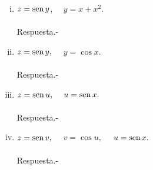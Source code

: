 \begin{enumerate}[\bfseries 1.]
	 \begin{enumerate}[(i)]

	     \item $z=\sen y$, $\quad y=x+x^2.$\\\\
		 Respuesta.-\; 

	     \item $z=\sen y,$ $\quad y=\cos x.$\\\\
		 Respuesta.-\;
	     
	     \item $z=\sen u,$ $\quad u=\sen x.$\\\\
		 Respuesta.-\;

	     \item $z=\sen v,$ $\quad v=\cos u,$ $\quad u=\sen x.$\\\\
		 Respuesta.-\;

	 \end{enumerate}

\end{enumerate}

